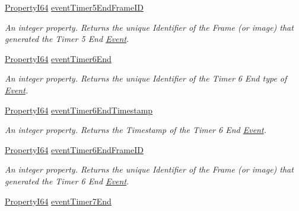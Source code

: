 \begin{DoxyCompactItemize}
\hyperlink{group___common_interface_ga81749b2696755513663492664a18a893}{Property\+I64} \hyperlink{classmv_i_m_p_a_c_t_1_1acquire_1_1_gen_i_cam_1_1_event_control_a816e64bd616314a4c54330fda85d70fa}{event\+Timer5\+End\+Frame\+I\+D}
\begin{DoxyCompactList}\small\item\em An integer property. Returns the unique Identifier of the Frame (or image) that generated the Timer 5 End \hyperlink{classmv_i_m_p_a_c_t_1_1acquire_1_1_event}{Event}. \end{DoxyCompactList}\item 
\hyperlink{group___common_interface_ga81749b2696755513663492664a18a893}{Property\+I64} \hyperlink{classmv_i_m_p_a_c_t_1_1acquire_1_1_gen_i_cam_1_1_event_control_a7d5ae51ef5f870e602e6cb6910e638ea}{event\+Timer6\+End}
\begin{DoxyCompactList}\small\item\em An integer property. Returns the unique Identifier of the Timer 6 End type of \hyperlink{classmv_i_m_p_a_c_t_1_1acquire_1_1_event}{Event}. \end{DoxyCompactList}\item 
\hyperlink{group___common_interface_ga81749b2696755513663492664a18a893}{Property\+I64} \hyperlink{classmv_i_m_p_a_c_t_1_1acquire_1_1_gen_i_cam_1_1_event_control_a64c6ded7ea7be2e5c1d4012f5dd38f0b}{event\+Timer6\+End\+Timestamp}
\begin{DoxyCompactList}\small\item\em An integer property. Returns the Timestamp of the Timer 6 End \hyperlink{classmv_i_m_p_a_c_t_1_1acquire_1_1_event}{Event}. \end{DoxyCompactList}\item 
\hyperlink{group___common_interface_ga81749b2696755513663492664a18a893}{Property\+I64} \hyperlink{classmv_i_m_p_a_c_t_1_1acquire_1_1_gen_i_cam_1_1_event_control_a0c16e4a8444ffe593477e1b08e237537}{event\+Timer6\+End\+Frame\+I\+D}
\begin{DoxyCompactList}\small\item\em An integer property. Returns the unique Identifier of the Frame (or image) that generated the Timer 6 End \hyperlink{classmv_i_m_p_a_c_t_1_1acquire_1_1_event}{Event}. \end{DoxyCompactList}\item 
\hyperlink{group___common_interface_ga81749b2696755513663492664a18a893}{Property\+I64} \hyperlink{classmv_i_m_p_a_c_t_1_1acquire_1_1_gen_i_cam_1_1_event_control_a6aa8a6a11210f9e09fdbdef45fccf564}{event\+Timer7\+End}

\end{DoxyCompactItemize}
